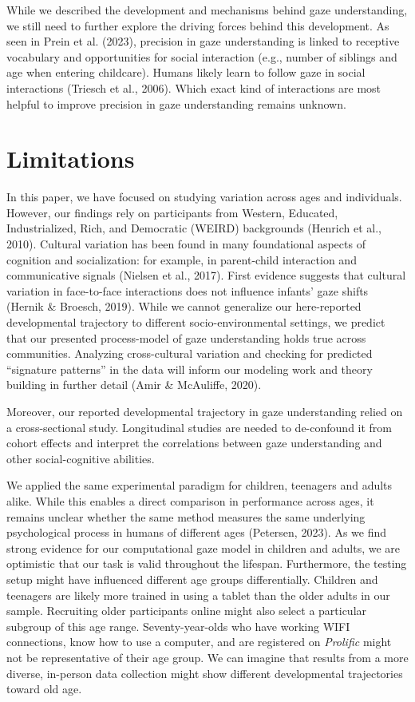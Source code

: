 \documentclass[
  man,mask,floatsintext]{apa7}
\begin{document}
While we described the development and mechanisms behind gaze understanding, we still need to further explore the driving forces behind this development. As seen in Prein et al. (2023), precision in gaze understanding is linked to receptive vocabulary and opportunities for social interaction (e.g., number of siblings and age when entering childcare). Humans likely learn to follow gaze in social interactions (Triesch et al., 2006). Which exact kind of interactions are most helpful to improve precision in gaze understanding remains unknown.

\hypertarget{limitations}{%
\section{Limitations}\label{limitations}}

In this paper, we have focused on studying variation across ages and individuals. However, our findings rely on participants from Western, Educated, Industrialized, Rich, and Democratic (WEIRD) backgrounds (Henrich et al., 2010). Cultural variation has been found in many foundational aspects of cognition and socialization: for example, in parent-child interaction and communicative signals (Nielsen et al., 2017). First evidence suggests that cultural variation in face-to-face interactions does not influence infants' gaze shifts (Hernik \& Broesch, 2019). While we cannot generalize our here-reported developmental trajectory to different socio-environmental settings, we predict that our presented process-model of gaze understanding holds true across communities. Analyzing cross-cultural variation and checking for predicted ``signature patterns'' in the data will inform our modeling work and theory building in further detail (Amir \& McAuliffe, 2020).

Moreover, our reported developmental trajectory in gaze understanding relied on a cross-sectional study. Longitudinal studies are needed to de-confound it from cohort effects and interpret the correlations between gaze understanding and other social-cognitive abilities.

We applied the same experimental paradigm for children, teenagers and adults alike. While this enables a direct comparison in performance across ages, it remains unclear whether the same method measures the same underlying psychological process in humans of different ages (Petersen, 2023). As we find strong evidence for our computational gaze model in children and adults, we are optimistic that our task is valid throughout the lifespan. Furthermore, the testing setup might have influenced different age groups differentially. Children and teenagers are likely more trained in using a tablet than the older adults in our sample. Recruiting older participants online might also select a particular subgroup of this age range. Seventy-year-olds who have working WIFI connections, know how to use a computer, and are registered on \emph{Prolific} might not be representative of their age group. We can imagine that results from a more diverse, in-person data collection might show different developmental trajectories toward old age.
\end{document}
